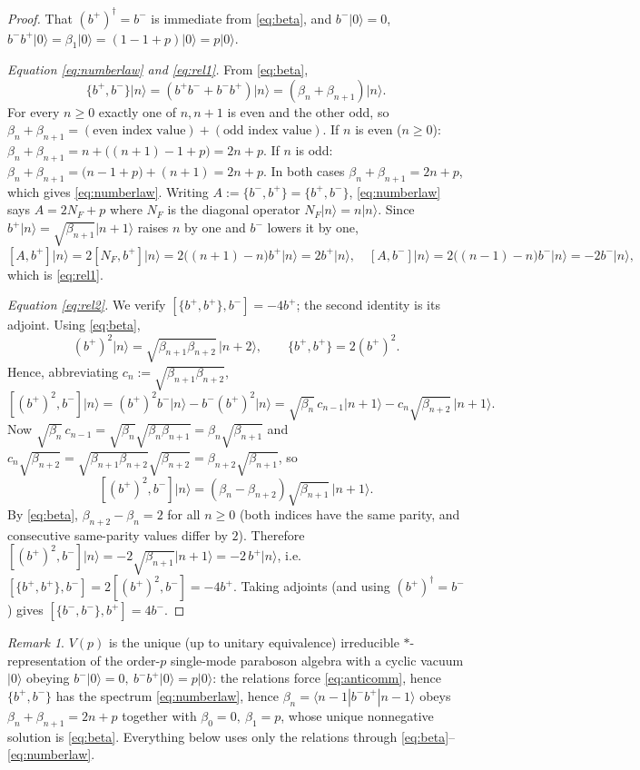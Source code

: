 \documentclass[12pt]{article}
\theoremstyle{definition}
\theoremstyle{remark}
\newtheorem{remark}{Remark}
\newcommand{\ket}[1]{\lvert #1\rangle}
\newcommand{\bp}{b^{+}}
\newcommand{\bm}{b^{-}}
\begin{document}
\begin{proof}
That $(\bp)^{\dagger}=\bm$ is immediate from \eqref{eq:beta}, and
$\bm\ket0=0$, $\bm\bp\ket0=\beta_1\ket0=(1-1+p)\ket0=p\ket0$.

\emph{Equation \eqref{eq:numberlaw} and \eqref{eq:rel1}.}
From \eqref{eq:beta},
\begin{equation}\label{eq:anticomm}
\{\bp,\bm\}\ket{n}=(\bp\bm+\bm\bp)\ket{n}=(\beta_n+\beta_{n+1})\ket{n}.
\end{equation}
For every $n\ge0$ exactly one of $n,n+1$ is even and the other odd, so
$\beta_n+\beta_{n+1}=(\text{even index value})+(\text{odd index value})$. If $n$ is
even ($n\ge0$): $\beta_n+\beta_{n+1}=n+\bigl((n+1)-1+p\bigr)=2n+p$. If $n$ is odd:
$\beta_n+\beta_{n+1}=\bigl(n-1+p\bigr)+(n+1)=2n+p$. In both cases
$\beta_n+\beta_{n+1}=2n+p$, which gives \eqref{eq:numberlaw}. Writing
$A:=\{\bm,\bp\}=\{\bp,\bm\}$, \eqref{eq:numberlaw} says $A=2N_F+p$ where $N_F$ is
the diagonal operator $N_F\ket n=n\ket n$. Since $\bp\ket n=\sqrt{\beta_{n+1}}\ket{n+1}$
raises $n$ by one and $\bm$ lowers it by one,
\[
[A,\bp]\ket n=2[N_F,\bp]\ket n=2\bigl((n+1)-n\bigr)\bp\ket n=2\bp\ket n,\quad
[A,\bm]\ket n=2\bigl((n-1)-n\bigr)\bm\ket n=-2\bm\ket n,
\]
which is \eqref{eq:rel1}.

\emph{Equation \eqref{eq:rel2}.}
We verify $[\{\bp,\bp\},\bm]=-4\bp$; the second identity is its adjoint. Using
\eqref{eq:beta},
\[
(\bp)^2\ket n=\sqrt{\beta_{n+1}\beta_{n+2}}\,\ket{n+2},\qquad
\{\bp,\bp\}=2(\bp)^2 .
\]
Hence, abbreviating $c_n:=\sqrt{\beta_{n+1}\beta_{n+2}}$,
\[
[(\bp)^2,\bm]\ket n=(\bp)^2\bm\ket n-\bm(\bp)^2\ket n
=\sqrt{\beta_n}\,c_{n-1}\ket{n+1}-c_n\sqrt{\beta_{n+2}}\,\ket{n+1}.
\]
Now $\sqrt{\beta_n}\,c_{n-1}=\sqrt{\beta_n}\sqrt{\beta_n\beta_{n+1}}=\beta_n\sqrt{\beta_{n+1}}$ and
$c_n\sqrt{\beta_{n+2}}=\sqrt{\beta_{n+1}\beta_{n+2}}\sqrt{\beta_{n+2}}=\beta_{n+2}\sqrt{\beta_{n+1}}$,
so
\[
[(\bp)^2,\bm]\ket n=(\beta_n-\beta_{n+2})\sqrt{\beta_{n+1}}\,\ket{n+1}.
\]
By \eqref{eq:beta}, $\beta_{n+2}-\beta_n=2$ for all $n\ge0$ (both indices have the
same parity, and consecutive same-parity values differ by $2$). Therefore
$[(\bp)^2,\bm]\ket n=-2\sqrt{\beta_{n+1}}\ket{n+1}=-2\,\bp\ket n$, i.e.
$[\{\bp,\bp\},\bm]=2[(\bp)^2,\bm]=-4\bp$. Taking adjoints (and using
$(\bp)^{\dagger}=\bm$) gives $[\{\bm,\bm\},\bp]=4\bm$.
\end{proof}

\begin{remark}
$V(p)$ is the unique (up to unitary equivalence) irreducible $*$-representation of
the order-$p$ single-mode paraboson algebra with a cyclic vacuum $\ket0$ obeying
$\bm\ket0=0,\ \bm\bp\ket0=p\ket0$: the relations force \eqref{eq:anticomm}, hence
$\{\bp,\bm\}$ has the spectrum \eqref{eq:numberlaw}, hence
$\beta_n=\langle n-1|\bm\bp|n-1\rangle$ obeys $\beta_{n}+\beta_{n+1}=2n+p$ together
with $\beta_0=0,\ \beta_1=p$, whose unique nonnegative solution is \eqref{eq:beta}.
Everything below uses only the relations through \eqref{eq:beta}--\eqref{eq:numberlaw}.
\end{remark}
\end{document}
